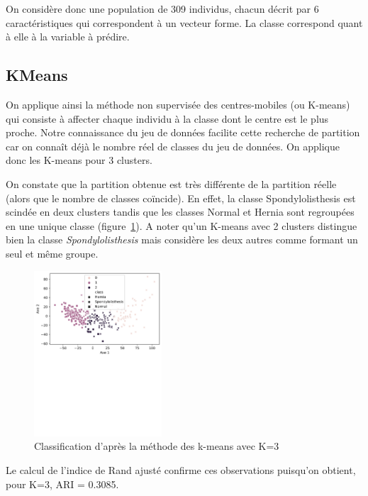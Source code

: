 \documentclass[twocolumn,10pt]{article}
\begin{document}
On considère donc une population de 309 individus, chacun décrit par 6 caractéristiques qui correspondent à un vecteur forme. La classe correspond quant à elle à la variable à prédire.

\subsection{KMeans}

On applique ainsi la méthode non supervisée des centres-mobiles (ou K-means) qui consiste à affecter chaque individu à la classe dont le centre est le plus proche. Notre connaissance du jeu de données facilite cette recherche de partition car on connaît déjà le nombre réel de classes du jeu de données. On applique donc les K-means pour 3 clusters.

On constate que la partition obtenue est très différente de la partition réelle (alors que le nombre de classes coïncide). En effet, la classe Spondylolisthesis est scindée en deux clusters tandis que les classes Normal et Hernia sont regroupées en une unique classe (figure~\ref{fig:KMeans_3}).
A noter qu'un K-means avec 2 clusters distingue bien la classe \textit{Spondylolisthesis} mais considère les deux autres comme formant un seul et même groupe.

\begin{figure}[htbp]
    \begin{center}
        \includegraphics[trim=0 14cm 0 0, width=0.425\textwidth]{figures/KMeans_3.pdf}
        \caption{\label{fig:KMeans_3}Classification d'après la méthode des k-means avec K=3}
    \end{center}
\end{figure}

Le calcul de l'indice de Rand ajusté confirme ces observations puisqu'on obtient, pour K=3, ARI = 0.3085.
\end{document}
